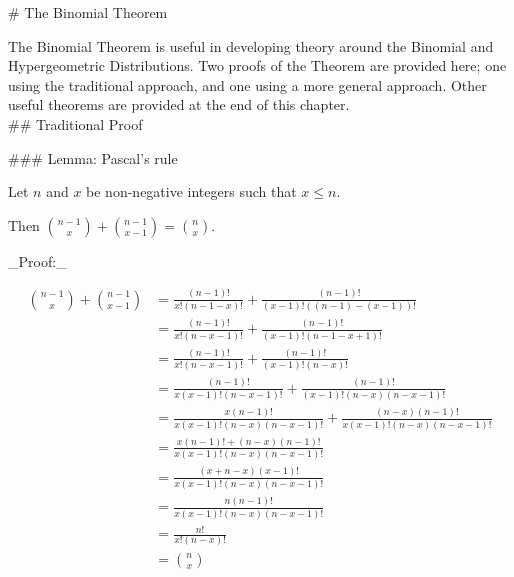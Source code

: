 # The Binomial Theorem

The Binomial Theorem is useful in developing theory around the Binomial and Hypergeometric Distributions.  Two proofs of the Theorem are provided here; one using the traditional approach, and one using a more general approach.  Other useful theorems are provided at the end of this chapter.\\

## Traditional Proof

### Lemma: Pascal's rule

Let $n$ and $x$ be non-negative integers such that $x\leq n$.

Then ${n-1\choose x} + {n-1\choose x-1} = {n\choose x}$.

_Proof:_

$$\begin{align*}
{n-1\choose x} + {n-1\choose x-1}
	&= \frac{(n-1)!}{x!(n-1-x)!} + \frac{(n-1)!}{(x-1)!((n-1)-(x-1))!}\\
  &= \frac{(n-1)!}{x!(n-x-1)!} + \frac{(n-1)!}{(x-1)!(n-1-x+1)!}\\
  &= \frac{(n-1)!}{x!(n-x-1)!} + \frac{(n-1)!}{(x-1)!(n-x)!}\\
  &= \frac{(n-1)!}{x(x-1)!(n-x-1)!} + \frac{(n-1)!}{(x-1)!(n-x)(n-x-1)!}\\
  &= \frac{x(n-1)!}{x(x-1)!(n-x)(n-x-1)!}
	  	+\frac{(n-x)(n-1)!}{x(x-1)!(n-x)(n-x-1)!}\\
  &= \frac{x(n-1)!+(n-x)(n-1)!}{x(x-1)!(n-x)(n-x-1)!} \\
	&= \frac{(x+n-x)(x-1)!}{x(x-1)!(n-x)(n-x-1)!}\\
  &= \frac{n(n-1)!}{x(x-1)!(n-x)(n-x-1)!} \\
	&= \frac{n!}{x!(n-x)!} \\
	&= {n\choose x}
\end{align*}$$

